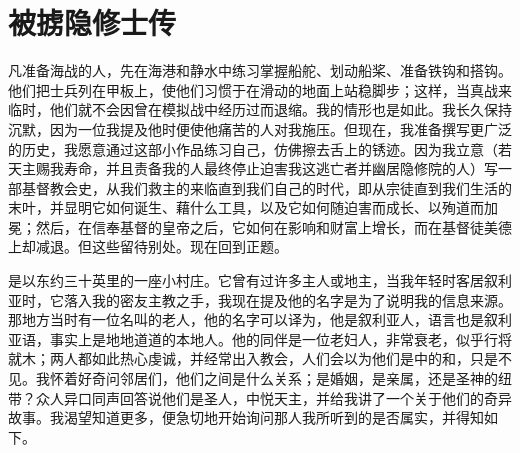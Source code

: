 
\chapter{被掳隐修士传}


\par

凡准备海战的人，先在海港和静水中练习掌握船舵、划动船桨、准备铁钩和搭钩。他们把士兵列在甲板上，使他们习惯于在滑动的地面上站稳脚步；这样，当真战来临时，他们就不会因曾在模拟战中经历过而退缩。我的情形也是如此。我长久保持沉默，因为一位我提及他时便使他痛苦的人对我施压。但现在，我准备撰写更广泛的历史，我愿意通过这部小作品练习自己，仿佛擦去舌上的锈迹。因为我立意（若天主赐我寿命，并且责备我的人最终停止迫害我这逃亡者并幽居隐修院的人）写一部基督教会史，从我们救主的来临直到我们自己的时代，即从宗徒直到我们生活的末叶，并显明它如何诞生、藉什么工具，以及它如何随迫害而成长、以殉道而加冕；然后，在信奉基督的皇帝之后，它如何在影响和财富上增长，而在基督徒美德上却减退。但这些留待别处。现在回到正题。\par

是以东约三十英里的一座小村庄。它曾有过许多主人或地主，当我年轻时客居叙利亚时，它落入我的密友主教之手，我现在提及他的名字是为了说明我的信息来源。那地方当时有一位名叫的老人，他的名字可以译为，他是叙利亚人，语言也是叙利亚语，事实上是地地道道的本地人。他的同伴是一位老妇人，非常衰老，似乎行将就木；两人都如此热心虔诚，并经常出入教会，人们会以为他们是中的和，只是不见。我怀着好奇问邻居们，他们之间是什么关系；是婚姻，是亲属，还是圣神的纽带？众人异口同声回答说他们是圣人，中悦天主，并给我讲了一个关于他们的奇异故事。我渴望知道更多，便急切地开始询问那人我所听到的是否属实，并得知如下。\par

